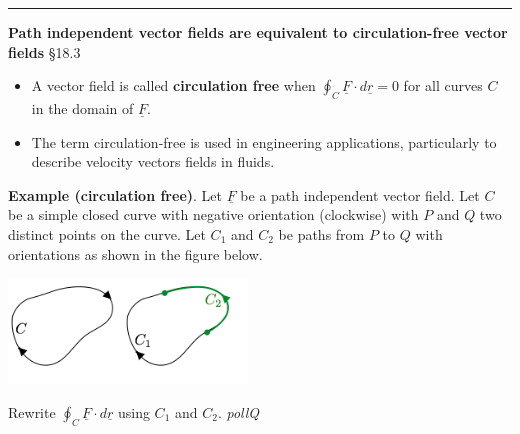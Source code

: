 \documentclass[12pt,letterpaper,noanswers]{exam}
\newcommand{\mb}[1]{\underline{#1}}
\begin{document}
\eject

\vspace{0.2cm}
\hrule
\vspace{0.2cm}


\noindent\textbf{Path independent vector fields are equivalent to circulation-free vector fields} \S 18.3
\begin{tcolorbox}
\begin{itemize}
\itemsep0em
    \item A vector field is called \textbf{circulation free} when $\displaystyle\oint_C \mb F\cdot d\mb r = 0$ for all curves $C$ in the domain of $\mb F$.
    \item The term circulation-free is used in engineering applications, particularly to describe velocity vectors fields in fluids.
\end{itemize}
\end{tcolorbox} 



\noindent\textbf{Example (circulation free)}.  Let $\mb F$ be a path independent vector field.  Let $C$ be a simple closed curve with negative orientation (clockwise) with $P$ and $Q$ two distinct points on the curve.  Let $C_1$ and $C_2$ be paths from $P$ to $Q$ with orientations as shown in the figure below.

\begin{multicols}{2}
\includegraphics[width=2.5in]{img/C27p2.png}

Rewrite $\displaystyle\oint_C \mb F\cdot d\mb r$  using $C_1$ and $C_2$.  \emph{pollQ}
\end{multicols}
\vspace{0.5in}






\end{document}
